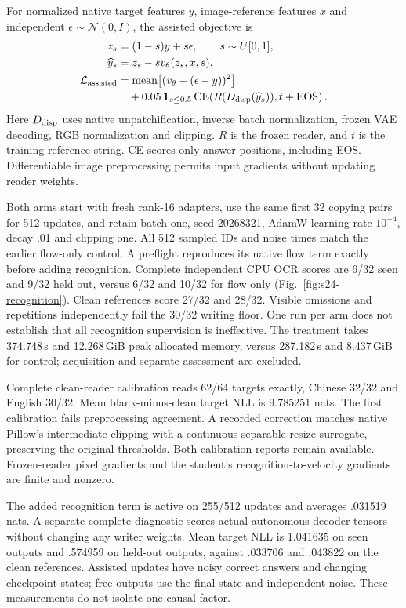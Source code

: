 \documentclass[10pt,a4paper]{article}
\begin{document}
For normalized native target features $y$, image-reference features $x$ and
independent $\epsilon\sim\mathcal N(0,I)$, the assisted objective is
\begin{align}
 z_s&=(1-s)y+s\epsilon,\qquad s\sim U[0,1],\\
 \widehat y_s&=z_s-sv_\theta(z_s,x,s),\\
 \mathcal L_{\mathrm{assisted}}
 &=\operatorname{mean}\bigl[(v_\theta-(\epsilon-y))^2\bigr]\nonumber\\
 &\quad+0.05\,\mathbf1_{s\leq0.5}
 \operatorname{CE}\!\left(R(D_{\rm disp}(\widehat y_s)),t+\mathrm{EOS}\right).
\end{align}
Here $D_{\rm disp}$ uses native unpatchification, inverse batch normalization,
frozen VAE decoding, RGB normalization and clipping. $R$ is the frozen reader,
and $t$ is the training reference
string. CE scores only answer positions, including EOS. Differentiable image
preprocessing permits input gradients without updating reader weights.

Both arms start with fresh rank-16 adapters, use the same first 32 copying
pairs for 512 updates, and retain batch one, seed 20268321, AdamW learning
rate $10^{-4}$, decay .01 and clipping one. All 512 sampled IDs and noise
times match the earlier flow-only control. A preflight reproduces its native
flow term exactly before adding recognition. Complete independent CPU OCR
scores are 6/32 seen and 9/32 held out, versus 6/32 and 10/32 for flow only
(Fig.~\ref{fig:s24-recognition}). Clean references score 27/32 and 28/32.
Visible omissions and repetitions independently fail the 30/32 writing floor.
One run per arm does not establish that all recognition supervision is
ineffective. The treatment takes 374.748\,s and 12.268\,GiB peak allocated
memory, versus 287.182\,s and 8.437\,GiB for control; acquisition and separate
assessment are excluded.

Complete clean-reader calibration reads 62/64 targets exactly, Chinese 32/32
and English 30/32. Mean blank-minus-clean target NLL is 9.785251 nats. The
first calibration fails preprocessing agreement. A recorded correction
matches native Pillow's intermediate clipping with a continuous separable
resize surrogate, preserving the original thresholds. Both calibration
reports remain available. Frozen-reader pixel gradients and the student's
recognition-to-velocity gradients are finite and nonzero.

The added recognition term is active on 255/512 updates and averages
.031519 nats. A separate complete diagnostic scores actual autonomous
decoder tensors without changing any writer weights. Mean target NLL is
1.041635 on seen outputs and .574959 on held-out outputs, against .033706
and .043822 on the clean references. Assisted updates have noisy correct
answers and changing checkpoint states; free outputs use the final state
and independent noise. These measurements do not isolate one causal factor.
\end{document}
